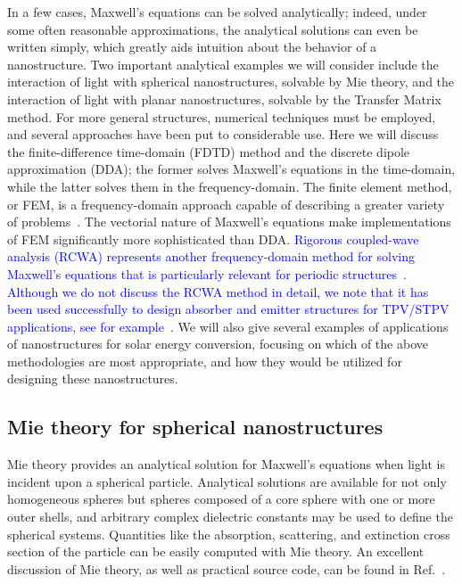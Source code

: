 \documentclass[10pt,letterpaper]{article}
\begin{document}
In a few cases, Maxwell's equations  can be solved analytically; indeed, under some often
reasonable approximations, the analytical solutions can even be written simply, which
greatly aids intuition about the behavior of a nanostructure.  Two important analytical examples we will
consider include the interaction of light with spherical nanostructures, solvable by Mie
theory, and the interaction of light with planar nanostructures, solvable by the Transfer
Matrix method.   For more general structures, numerical techniques must be employed, and
several approaches have been put to considerable use.  Here we will
discuss the finite-difference time-domain (FDTD) method and the discrete dipole
approximation (DDA); the former solves Maxwell's equations in the time-domain, while the 
latter
solves them in the frequency-domain.  The finite element method, or FEM, is a  
frequency-domain approach capable of describing a greater variety of problems~\cite{fem}.
The vectorial
nature of Maxwell's equations make
implementations of FEM significantly more sophisticated than DDA.  \textcolor{blue}{Rigorous coupled-wave analysis (RCWA) represents
another frequency-domain method for solving Maxwell's equations that is particularly relevant for periodic structures~\cite{RCWA1,RCWA2}.
Although we do not discuss the RCWA method in detail, we note that it has been used successfully to design
absorber and emitter structures for TPV/STPV applications, see for example~\cite{RCWA3}.}
We will also give several
examples of applications of nanostructures for
solar energy conversion, focusing on which of the above methodologies are most
appropriate, and how they would be utilized for designing these nanostructures.

\subsection{Mie theory for spherical nanostructures}
Mie theory provides an analytical solution for Maxwell's equations when light is incident
upon a spherical particle. Analytical solutions are available for not only
homogeneous spheres but spheres composed of a core sphere with one or more outer shells, and
arbitrary complex dielectric constants may be used to define the spherical systems.   
Quantities like the absorption, scattering, and extinction cross section of the particle
can be easily computed with Mie theory. 
An excellent
discussion of Mie theory, as well as practical source code, can be found in Ref.~\cite{Bohren}.
\end{document}
